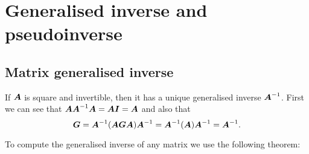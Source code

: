\documentclass{report}
\begin{document}
	\chapter{Generalised inverse and pseudoinverse}
	\section{Matrix generalised inverse}
	
	If $\boldsymbol{A}$ is square and invertible, then it has a unique generalised inverse $\boldsymbol{A}^{-1}$. First we can see that $\boldsymbol{A}\boldsymbol{A}^{-1}\boldsymbol{A}=\boldsymbol{A}\boldsymbol{I}=\boldsymbol{A}$ and also that
	$$\boldsymbol{G}=\boldsymbol{A}^{-1}(\boldsymbol{A}\boldsymbol{G}\boldsymbol{A})\boldsymbol{A}^{-1}=\boldsymbol{A}^{-1}(\boldsymbol{A})\boldsymbol{A}^{-1}=\boldsymbol{A}^{-1}.$$
	
	To compute the generalised inverse of any matrix we use the following theorem:
	
\end{document}
